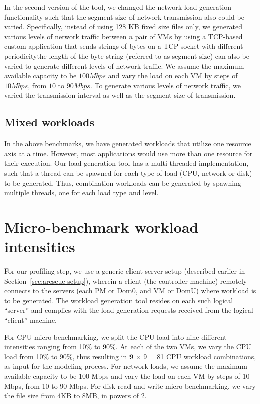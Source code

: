 In the second version of the tool, we changed 
the network load generation functionality such that
the segment size of network transmission also could be varied. 
Specifically, instead of using 128 KB fixed
size files only, we generated various levels of 
network traffic between a pair of VMs by using
a TCP-based custom application that sends 
strings of bytes on a
TCP socket with different periodicity\textemdash{}the 
length of the byte string (referred to as segment size)
can also be varied to generate different levels of network traffic.
We assume the maximum available capacity to be $100Mbps$ and vary the load on each VM by steps
of $10Mbps$, from $10$ to $90 Mbps$. 
To generate various levels of network traffic, we varied
the transmission interval as well as the segment size of transmission.

\subsection{Mixed workloads}
In the above benchmarks, we have generated workloads that utilize one 
resource axis at a time. However, most applications would use more than
one resource for their execution.
Our load generation tool has a multi-threaded implementation, such that a thread 
can be spawned for each type of load (CPU, network or disk) to be generated.
Thus, combination workloads can be generated by spawning multiple threads, one 
for each load type and level. 

\section{Micro-benchmark workload intensities}
For our profiling step, we use a generic client-server setup (described earlier 
in Section~\ref{sec:arescue-setup}), wherein a client (the controller 
machine) remotely connects to the servers (each PM or Dom0, 
and VM or DomU) where workload is to be generated. The workload 
generation tool resides on each such logical ``server'' and complies 
with the load generation requests received from the logical ``client'' machine.

For CPU micro-benchmarking, we split the CPU load into nine different intensities ranging
from 10\% to 90\%. At each of the two VMs, we vary the CPU load from 10\% to 90\%, thus
resulting in 9 $\times$ 9 = 81 CPU workload combinations, as input for the modeling process. For
network loads, we assume the maximum available capacity to be 100 Mbps and vary the load on
each VM by steps of 10 Mbps, from 10 to 90 Mbps. For disk read and write micro-benchmarking,
we vary the file size from 4KB to 8MB, in powers of 2. 

